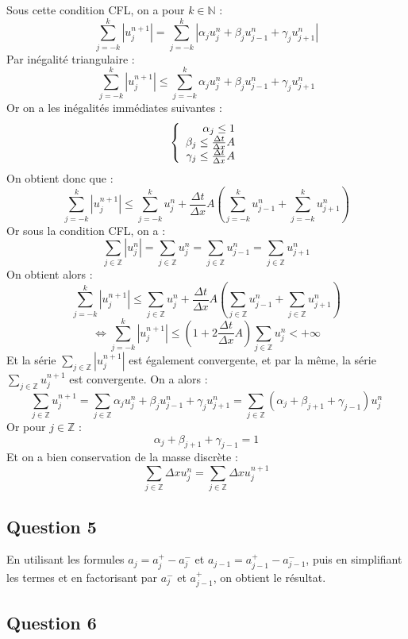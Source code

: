 \documentclass[a4paper,12pt]{article}
\begin{document}
Sous cette condition CFL, on a pour $k \in \mathbb{N}$ :
\[\sum_{j=-k}^{k} |u_{j}^{n+1}|=\sum_{j=-k}^{k} |\alpha_j u_{j}^{n}+\beta_j u_{j-1}^{n}+\gamma_j u_{j+1}^{n}|\]
Par in\'egalit\'e triangulaire :
\[\sum_{j=-k}^{k} |u_{j}^{n+1}| \leq \sum_{j=-k}^{k} \alpha_j u_{j}^{n}+\beta_j u_{j-1}^{n}+\gamma_j u_{j+1}^{n}\]
Or on a les in\'egalit\'es imm\'ediates suivantes :
\[
\left\{
\begin{array}{r c l}
\alpha_j \leq 1\\
\beta_j \leq \frac{\Delta t}{\Delta x}A\\
\gamma_j \leq \frac{\Delta t}{\Delta x}A
\end{array}
\right.
\]
On obtient donc que :
\[\sum_{j=-k}^{k} |u_{j}^{n+1}| \leq \sum_{j=-k}^{k} u_{j}^{n} +\frac{\Delta t}{\Delta x}A\left(\sum_{j=-k}^{k} u_{j-1}^{n} + \sum_{j=-k}^{k} u_{j+1}^{n}\right)\]
Or sous la condition CFL, on a :
\[\sum_{j\in\mathbb{Z}} |u_{j}^{n}|=\sum_{j\in\mathbb{Z}} u_{j}^{n}=\sum_{j\in\mathbb{Z}} u_{j-1}^{n}=\sum_{j\in\mathbb{Z}} u_{j+1}^{n}\]
On obtient alors :
\[\sum_{j=-k}^{k} |u_{j}^{n+1}| \leq \sum_{j\in\mathbb{Z}} u_{j}^{n} + \frac{\Delta t}{\Delta x}A\left(\sum_{j\in\mathbb{Z}} u_{j-1}^{n}+\sum_{j\in\mathbb{Z}} u_{j+1}^{n}\right)\]
\[\iff \sum_{j=-k}^{k} |u_{j}^{n+1}| \leq \left(1+2\frac{\Delta t}{\Delta x}A\right)\sum_{j\in\mathbb{Z}} u_{j}^{n}<+\infty\]
Et la s\'erie $\sum_{j\in\mathbb{Z}} |u_{j}^{n+1}|$ est \'egalement convergente, et par la m\^eme, la s\'erie $\sum_{j\in\mathbb{Z}} u_{j}^{n+1}$ est convergente. On a alors :
\[\sum_{j\in\mathbb{Z}} u_{j}^{n+1}=\sum_{j\in\mathbb{Z}} \alpha_j u_{j}^{n}+\beta_j u_{j-1}^{n}+\gamma_j u_{j+1}^{n}=\sum_{j\in\mathbb{Z}} (\alpha_j+\beta_{j+1}+\gamma_{j-1})u_{j}^{n}\]
Or pour $j\in\mathbb{Z}$ :
\[\alpha_j+\beta_{j+1}+\gamma_{j-1}=1\]
Et on a bien conservation de la masse discr\`ete :
\[\sum_{j\in\mathbb{Z}} \Delta x u_{j}^{n}=\sum_{j\in\mathbb{Z}} \Delta x u_{j}^{n+1}\]

\subsection{Question 5}

En utilisant les formules $a_j=a_{j}^{+}-a_{j}^{-}$ et $a_{j-1}=a_{j-1}^{+}-a_{j-1}^{-}$, puis en simplifiant les termes et en factorisant par $a_{j}^{-}$ et $a_{j-1}^{+}$, on obtient le r\'esultat.

\subsection{Question 6}
\end{document}
